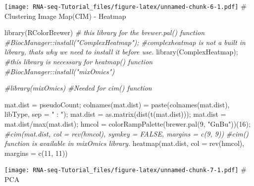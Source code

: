 \documentclass[
]{article}
\newenvironment{Shaded}{\begin{snugshade}}{\end{snugshade}}
\newcommand{\AttributeTok}[1]{\textcolor[rgb]{0.77,0.63,0.00}{#1}}
\newcommand{\CommentTok}[1]{\textcolor[rgb]{0.56,0.35,0.01}{\textit{#1}}}
\newcommand{\ConstantTok}[1]{\textcolor[rgb]{0.00,0.00,0.00}{#1}}
\newcommand{\DecValTok}[1]{\textcolor[rgb]{0.00,0.00,0.81}{#1}}
\newcommand{\FunctionTok}[1]{\textcolor[rgb]{0.00,0.00,0.00}{#1}}
\newcommand{\NormalTok}[1]{#1}
\newcommand{\OtherTok}[1]{\textcolor[rgb]{0.56,0.35,0.01}{#1}}
\newcommand{\SpecialCharTok}[1]{\textcolor[rgb]{0.00,0.00,0.00}{#1}}
\newcommand{\StringTok}[1]{\textcolor[rgb]{0.31,0.60,0.02}{#1}}
\begin{document}
\texttt{[image: RNA-seq-Tutorial\_files/figure-latex/unnamed-chunk-6-1.pdf]}
\# Clustering Image Map(CIM) - Heatmap

\begin{Shaded}
\begin{Highlighting}[]
\FunctionTok{library}\NormalTok{(RColorBrewer) }\CommentTok{\# this library for the brewer.pal() function}
\CommentTok{\#BiocManager::install("ComplexHeatmap"); \#complexheatmap is not a built in library, thats why we need to install it before use.}
\FunctionTok{library}\NormalTok{(ComplexHeatmap); }\CommentTok{\#this library is necessary for heatmap() function}
\CommentTok{\#BiocManager::install("mixOmics")}

\CommentTok{\#library(mixOmics) \#Needed for cim() function}


\NormalTok{mat.dist }\OtherTok{=}\NormalTok{ pseudoCount;}
\FunctionTok{colnames}\NormalTok{(mat.dist) }\OtherTok{=} \FunctionTok{paste}\NormalTok{(}\FunctionTok{colnames}\NormalTok{(mat.dist), libType, }\AttributeTok{sep =} \StringTok{" : "}\NormalTok{);}
\NormalTok{mat.dist }\OtherTok{=} \FunctionTok{as.matrix}\NormalTok{(}\FunctionTok{dist}\NormalTok{(}\FunctionTok{t}\NormalTok{(mat.dist)));}
\NormalTok{mat.dist }\OtherTok{=}\NormalTok{ mat.dist}\SpecialCharTok{/}\FunctionTok{max}\NormalTok{(mat.dist);}
\NormalTok{hmcol }\OtherTok{=} \FunctionTok{colorRampPalette}\NormalTok{(}\FunctionTok{brewer.pal}\NormalTok{(}\DecValTok{9}\NormalTok{, }\StringTok{"GnBu"}\NormalTok{))(}\DecValTok{16}\NormalTok{);}
\CommentTok{\#cim(mat.dist, col = rev(hmcol), symkey = FALSE, margins = c(9, 9))}
\CommentTok{\#cim() function is available in mixOmics library.}
\FunctionTok{heatmap}\NormalTok{(mat.dist, }\AttributeTok{col =} \FunctionTok{rev}\NormalTok{(hmcol), }\AttributeTok{margins =} \FunctionTok{c}\NormalTok{(}\DecValTok{11}\NormalTok{, }\DecValTok{11}\NormalTok{))}
\end{Highlighting}
\end{Shaded}

\texttt{[image: RNA-seq-Tutorial\_files/figure-latex/unnamed-chunk-7-1.pdf]}
\# PCA

\begin{Shaded}
\end{Shaded}
\end{document}
